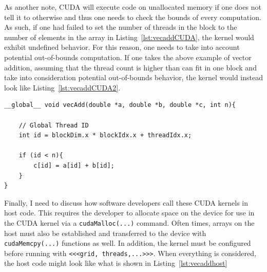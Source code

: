 As another note, CUDA will execute code on unallocated memory if one does not tell it to otherwise and thus one needs to check the bounds of every computation.
As such, if one had failed to set the number of threads in the block to the number of elements in the array in Listing~\ref{lst:vecaddCUDA}, the kernel would exhibit undefined behavior.
For this reason, one needs to take into account potential out-of-bounds computation.
If one takes the above example of vector addition, assuming that the thread count is higher than can fit in one block and take into consideration potential out-of-bounds behavior, the kernel would instead look like Listing~\ref{lst:vecaddCUDA2}.

\begin{lstlisting}[float,label=lst:vecaddCUDA2, style=c++,caption={An example of a vector addition kernel in CUDA using blocks and threads, and ensuring no computation happens beyond the size of the array, $n$.}]
__global__ void vecAdd(double *a, double *b, double *c, int n){

    // Global Thread ID
    int id = blockDim.x * blockIdx.x + threadIdx.x;

    if (id < n){
        c[id] = a[id] + b[id];
    }
}
\end{lstlisting}

Finally, I need to discuss how software developers call these CUDA kernels in host code.
This requires the developer to allocate space on the device for use in the CUDA kernel via a \texttt{cudaMalloc(...)} command.
Often times, arrays on the host must also be established and transferred to the device with \texttt{cudaMemcpy(...)} functions as well.
In addition, the kernel must be configured before running with \lstinline{<<<grid, threads,...>>>}.
When everything is considered, the host code might look like what is shown in Listing~\ref{lst:vecaddhost}

